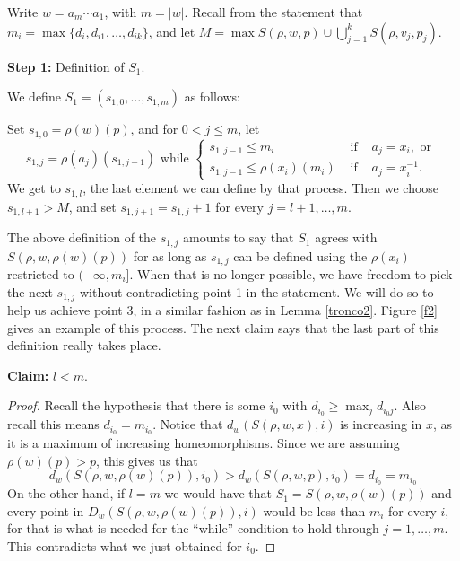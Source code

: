 \documentclass[12pt]{article}
\theoremstyle{definition}
\newcommand{\vs}{\vspace{0.3cm}}
\begin{document}
Write $w=a_m\cdots a_1$, with $m=|w|$. Recall from the statement that $m_i=\max\{d_i,d_{i1},\ldots,d_{ik}\}$, and let $M=\max S(\rho,w,p)\cup\bigcup_{j=1}^k S(\rho,v_j,p_j)$.

\vs

{\flushleft \bf Step 1:} Definition of $S_1$.
\vs


We define $S_1 = (s_{1,0},\ldots,s_{1,m})$ as follows:

Set $s_{1,0}=\rho(w)(p)$, and for $0<j\leq m$, let $$ s_{1,j}= \rho(a_j)(s_{1,j-1}) \text{ while } \left\{ \begin{array}{ccc} s_{1,j-1} \leq m_i & \text{ if } & a_j=x_i, \text{ or } \\ s_{1,j-1} \leq \rho(x_i)(m_i) & \text{ if } & a_j=x_i^{-1}. \end{array} \right. $$ We get to $s_{1,l}$, the last element we can define by that process. Then we choose $s_{1,l+1}>M$, and set $s_{1,j+1}=s_{1,j}+1$ for every $j= l+1,\ldots,m$.

The above definition of the $s_{1,j}$ amounts to say that $S_1$ agrees with $S(\rho,w,\rho(w)(p))$ for as long as $s_{1,j}$ can be defined using the $\rho(x_i)$ restricted to $(-\infty,m_i]$. When that is no longer possible, we have freedom to pick the next $s_{1,j}$ without contradicting point 1 in the statement. We will do so to help us achieve point 3, in a similar fashion as in Lemma \ref{tronco2}. Figure \ref{f2} gives an example of this process. The next claim says that the last part of this definition really takes place.

\vs

{\bf Claim:} $l<m$.  
\vs

\begin{proof} Recall the hypothesis that there is some $i_0$ with $d_{i_0}\geq \max_j d_{i_0j}$. Also recall this means $d_{i_0}=m_{i_0}$. Notice that $d_w(S(\rho,w,x),i)$ is increasing in $x$, as it is a maximum of increasing homeomorphisms. Since we are assuming $\rho(w)(p)>p$, this gives us that $$ d_w(S(\rho,w,\rho(w)(p)),i_0) > d_w(S(\rho,w,p),i_0) = d_{i_0} = m_{i_0}$$ 
On the other hand, if $l=m$ we would have that $S_1=S(\rho,w,\rho(w)(p))$ and every point in $D_w(S(\rho,w,\rho(w)(p)),i)$ would be less than $m_i$ for every $i$, for that is what is needed for the ``while'' condition to hold through $j=1,\ldots,m$. This contradicts what we just obtained for $i_0$.


\end{proof}
\end{document}
